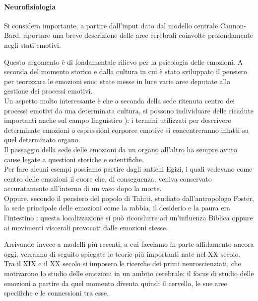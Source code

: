 \paragraph{Neurofisiologia}
\label{par: Neurofisiologia}
Si considera importante, a partire dall’input dato dal modello centrale Cannon-Bard, riportare una breve descrizione delle aree cerebrali coinvolte profondamente negli stati emotivi. 

Questo argomento è di fondamentale rilievo per la psicologia delle emozioni. A seconda del momento storico e dalla cultura in cui è stato sviluppato il pensiero per teorizzare le emozioni sono state messe in luce varie aree deputate alla gestione dei processi emotivi.\\
Un aspetto molto interessante è che a seconda della sede ritenuta centro dei processi emotivi da una determinata cultura, si possono individuare delle ricadute importanti anche sul campo linguistico \parencite{storia_delle_emozioni}): i termini utilizzati per descrivere determinate emozioni o espressioni corporee emotive si concentreranno infatti  su quel determinato organo.\\
Il passaggio della sede delle emozioni da un organo all’altro ha sempre avuto cause legate a questioni storiche e scientifiche.\\
Per fare alcuni esempi possiamo partire dagli antichi Egizi, i quali vedevano come centro delle emozioni il cuore che, di conseguenza, veniva conservato accuratamente all’interno di un vaso dopo la morte.\\
Oppure, secondo il pensiero del popolo di Tahiti, studiato dall’antropologo Foster, la sede principale delle emozioni come la rabbia, il desiderio e la paura era l’intestino \parencite{foster}: questa localizzazione si può ricondurre ad un’influenza Biblica oppure ai movimenti viscerali provocati dalle emozioni stesse.

Arrivando invece a modelli più recenti, a cui facciamo in parte affidamento ancora oggi, verranno di seguito spiegate le teorie più importanti nate nel XX secolo.\\
Tra il XIX e il XX secolo si imposero le ricerche dei primi neuroscienziati, che motivarono lo studio delle emozioni in un ambito cerebrale: il focus di studio delle emozioni a partire da quel momento diventa quindi il cervello, le sue aree specifiche e le connessioni tra esse.

